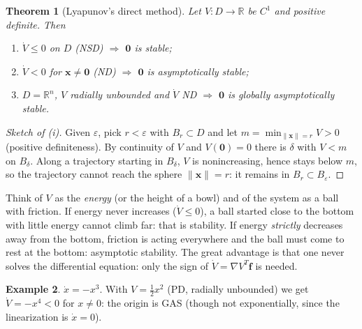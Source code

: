 \documentclass[11pt,a4paper]{article}
\newcommand{\R}{\mathbb{R}}
\theoremstyle{plain}
\newtheorem{theorem}{Theorem}[section]
\theoremstyle{definition}
\newtheorem{example}[theorem]{Example}
\theoremstyle{remark}
\begin{document}
\begin{theorem}[Lyapunov's direct method]\label{thm:lyap}
Let $V:D\to\R$ be $C^1$ and positive definite. Then
\begin{enumerate}[label=(\roman*),leftmargin=*,nosep]
\item $\dot V\le0$ on $D$ (NSD) $\Rightarrow$ $\bm 0$ is stable;
\item $\dot V<0$ for $\bm x\ne\bm 0$ (ND) $\Rightarrow$ $\bm 0$ is asymptotically stable;
\item $D=\R^n$, $V$ radially unbounded and $\dot V$ ND $\Rightarrow$ $\bm 0$ is globally asymptotically stable.
\end{enumerate}
\end{theorem}

\begin{proof}[Sketch of (i)]
Given $\varepsilon$, pick $r<\varepsilon$ with $B_r\subset D$ and let $m=\min_{\|\bm x\|=r}V>0$ (positive definiteness). By continuity of $V$ and $V(\bm 0)=0$ there is $\delta$ with $V<m$ on $B_\delta$. Along a trajectory starting in $B_\delta$, $V$ is nonincreasing, hence stays below $m$, so the trajectory cannot reach the sphere $\|\bm x\|=r$: it remains in $B_r\subset B_\varepsilon$.
\end{proof}

\begin{intuition}
Think of $V$ as the \emph{energy} (or the height of a bowl) and of the system as a ball with friction. If energy never increases ($\dot V\le0$), a ball started close to the bottom with little energy cannot climb far: that is stability. If energy \emph{strictly} decreases away from the bottom, friction is acting everywhere and the ball must come to rest at the bottom: asymptotic stability. The great advantage is that one never solves the differential equation: only the sign of $\dot V=\nabla V^T\bm f$ is needed.
\end{intuition}

\begin{example}\label{ex:cubic}
$\dot x=-x^3$. With $V=\frac12x^2$ (PD, radially unbounded) we get $\dot V=-x^4<0$ for $x\ne0$: the origin is GAS (though not exponentially, since the linearization is $\dot x=0$).
\end{example}
\end{document}
